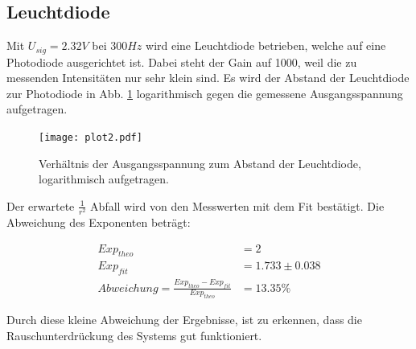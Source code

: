 \subsection{Leuchtdiode}
\label{sec:Leuchtdiode}

Mit $U_{sig} = 2.32 V$ bei $300 Hz$ wird eine Leuchtdiode betrieben, welche auf eine Photodiode ausgerichtet ist.
Dabei steht der Gain auf 1000, weil die zu messenden Intensitäten nur sehr klein sind.
Es wird der Abstand der Leuchtdiode zur Photodiode in Abb. \ref{fig:plot2} logarithmisch gegen die gemessene Ausgangsspannung aufgetragen.

\begin{figure}
  \centering
  \texttt{[image: plot2.pdf]}
  \caption{Verhältnis der Ausgangsspannung zum Abstand der Leuchtdiode, logarithmisch aufgetragen.}
  \label{fig:plot2}
\end{figure}

Der erwartete $\frac{1}{r^2}$ Abfall wird von den Messwerten mit dem Fit bestätigt.
Die Abweichung des Exponenten beträgt:

\begin{align*}
  Exp_{theo} &= 2 \\
  Exp_{fit} &= 1.733 \pm 0.038 \\
  Abweichung = \frac{Exp_{theo} - Exp_{fit}}{Exp_{theo}} &= 13.35 \%
\end{align*}

Durch diese kleine Abweichung der Ergebnisse, ist zu erkennen, dass die Rauschunterdrückung des Systems gut funktioniert.